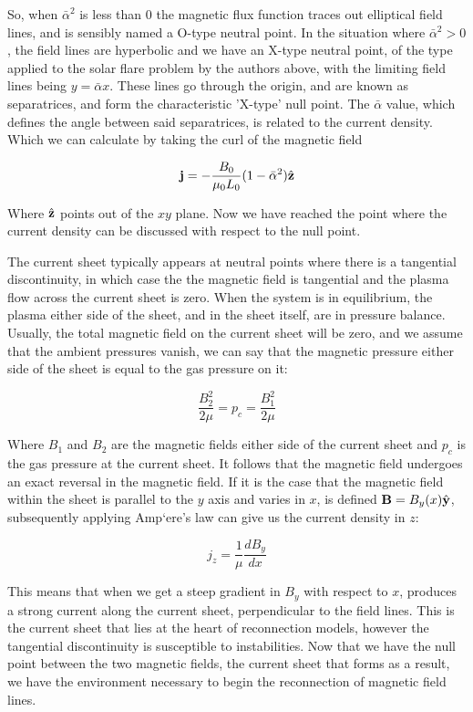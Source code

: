 So, when $\bar{\alpha}^2$ is less than $0$ the magnetic flux function traces out elliptical field lines, and is sensibly named a O-type neutral point.
In the situation where $\bar{\alpha}^2 > 0$, the field lines are hyperbolic and we have an X-type neutral point, of the type applied to the solar flare problem by the authors above, with the limiting field lines being $y = \bar{\alpha}x$.
These lines go through the origin, and are known as separatrices, and form the characteristic 'X-type' null point. 
The $\bar{\alpha}$ value, which defines the angle between said separatrices, is related to the current density.
Which we can calculate by taking the curl of the magnetic field

\begin{equation}
	\mathbf{j} = -\frac{B_0}{\mu_0L_0}(1 - \bar{\alpha}^2)\hat{\mathbf{z}}
\end{equation}

Where $\hat{\mathbf{z}}$ points out of the $xy$ plane.
Now we have reached the point where the current density can be discussed with respect to the null point.

The current sheet typically appears at neutral points where there is a tangential discontinuity, in which case the the magnetic field is tangential and the plasma flow across the current sheet is zero.
When the system is in equilibrium, the plasma either side of the sheet, and in the sheet itself, are in pressure balance.
Usually, the total magnetic field on the current sheet will be zero, and we assume that the ambient pressures vanish, we can say that the magnetic pressure either side of the sheet is equal to the gas pressure on it:

\begin{equation}
	\frac{B_2^2}{2\mu} = p_c = \frac{B_1^2}{2\mu}
\end{equation}

Where $B_1$ and $B_2$ are the magnetic fields either side of the current sheet and $p_c$ is the gas pressure at the current sheet.
It follows that the magnetic field undergoes an exact reversal in the magnetic field.
If it is the case that the magnetic field within the sheet is parallel to the $y$ axis and varies in $x$, is defined $\mathbf{B} = B_y(x)\hat{\mathbf{y}}$, subsequently applying Amp{`e}re's law can give us the current density in $z$:

\begin{equation}
	j_z = \frac{1}{\mu}\frac{dB_y}{dx}
\end{equation}

This means that when we get a steep gradient in $B_y$ with respect to $x$, produces a strong current along the current sheet, perpendicular to the field lines.
This is the current sheet that lies at the heart of reconnection models, however the tangential discontinuity is susceptible to instabilities.
Now that we have the null point between the two magnetic fields, the current sheet that forms as a result, we have the environment necessary to begin the reconnection of magnetic field lines.

